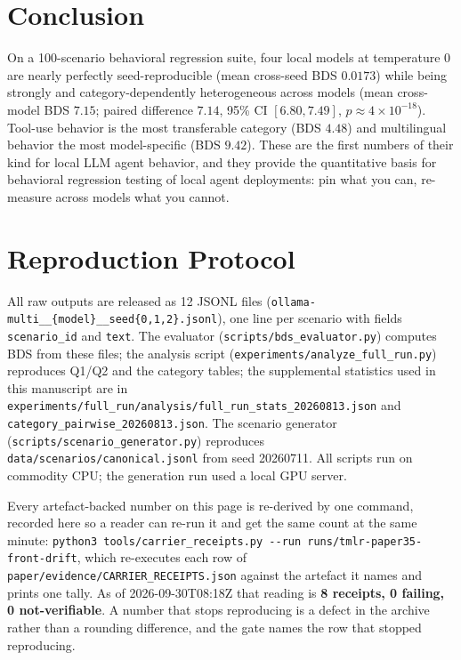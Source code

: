 \documentclass[11pt]{article}
\begin{document}
\section{Conclusion}
\label{sec:conclusion}

On a 100-scenario behavioral regression suite, four local models at
temperature 0 are nearly perfectly seed-reproducible (mean cross-seed BDS
$0.0173$) while being strongly and category-dependently heterogeneous
across models (mean cross-model BDS $7.15$; paired difference $7.14$, 95\%
CI $[6.80, 7.49]$, $p \approx 4\times10^{-18}$). Tool-use behavior is the
most transferable category (BDS $4.48$) and multilingual behavior the most
model-specific (BDS $9.42$). These are the first numbers of their kind for
local LLM agent behavior, and they provide the quantitative basis for
behavioral regression testing of local agent deployments: pin what you
can, re-measure across models what you cannot.




\appendix
\section{Reproduction Protocol}
\label{app:repro}

All raw outputs are released as 12 JSONL files
(\texttt{ollama-multi\_\_\{model\}\_\_seed\{0,1,2\}.jsonl}), one line per
scenario with fields \texttt{scenario\_id} and \texttt{text}. The
evaluator (\texttt{scripts/bds\_evaluator.py}) computes BDS from these
files; the analysis script
(\texttt{experiments/analyze\_full\_run.py}) reproduces Q1/Q2 and the
category tables; the supplemental statistics used in this manuscript are
in
\texttt{experiments/full\_run/analysis/full\_run\_stats\_20260813.json} and
\texttt{category\_pairwise\_20260813.json}. The scenario generator
(\texttt{scripts/scenario\_generator.py}) reproduces
\texttt{data/scenarios/canonical.jsonl} from seed 20260711. All scripts run
on commodity CPU; the generation run used a local GPU server.

Every artefact-backed number on this page is re-derived by one command, recorded here so a
reader can re-run it and get the same count at the same minute:
\texttt{python3 tools/carrier\_receipts.py -{}-run runs/tmlr-paper35-front-drift}, which re-executes
each row of \texttt{paper/evidence/CARRIER\_RECEIPTS.json} against the artefact it names and prints one tally. As of
2026-09-30T08:18Z that reading is \textbf{8 receipts, 0 failing, 0 not-verifiable}.
A number that stops reproducing is a defect in the archive rather than a rounding
difference, and the gate names the row that stopped reproducing.
\end{document}
